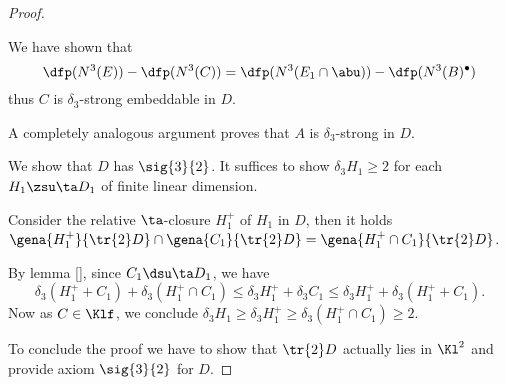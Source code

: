 \begin{proof}
\begin{itemize}
We have shown that
$$\dfp(N^{3}(E))-\dfp(N^{3}(C))=\dfp(N^{3}(E_{1}\cap\abu))-\dfp(N^{3}(B)^{\bullet})$$
thus $C$ is $\delta_{3}$-strong embeddable in $D$.

A completely analogous argument proves that $A$ is $\delta_{3}$-strong in $D$.
\end{itemize}

\smallskip
We show that $D$ has $\sig{3}{2}$.
It suffices to show $\delta_{3}H_{1}\geq2$ for each  $H_{1}\zsu\ta D_{1}$ of finite linear dimension. 

Consider the relative $\ta$-closure $H_{1}^{+}$ of $H_{1}$ in $D$, then it holds
$\gena{H_{1}^{+}}{\tr{2}D}\cap\gena{C_{1}}{\tr{2}D}=\gena{H_{1}^{+}\cap C_{1}}{\tr{2}D}$.

By lemma \ref{}, since $C_{1}\dsu\ta D_{1}$, we have
$$
\delta_{3}(H_{1}^{+}+C_{1})+\delta_{3}(H_{1}^{+}\cap C_{1})
\leq\delta_{3}H_{1}^{+}+\delta_{3}C_{1}\leq\delta_{3}H_{1}^{+}+\delta_{3}(H_{1}^{+}+C_{1}).
$$
Now as $C\in\Klf$, we conclude
$\delta_{3}H_{1}\geq\delta_{3}H_{1}^{+}\geq\delta_{3}(H_{1}^{+}\cap C_{1})\geq2$.


To conclude the proof we have to
show that $\tr{2}D$ actually lies in $\Kl^{2}$ and provide axiom $\sig{3}{2}$ for $D$.
\end{proof}
